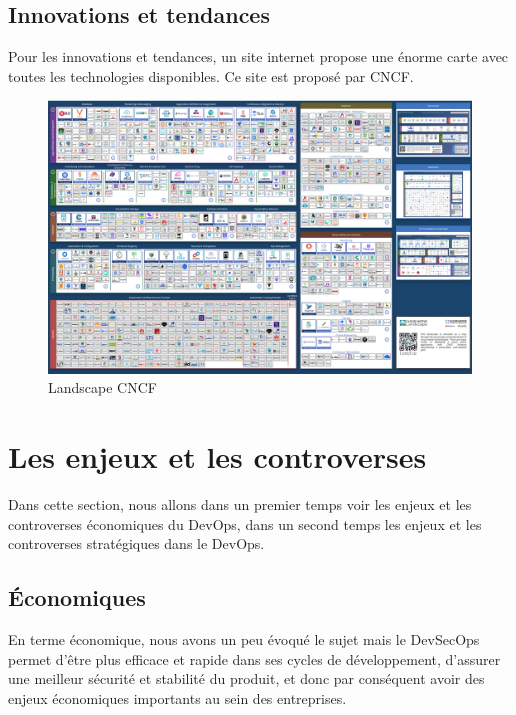 \documentclass[11pt,a4paper,oneside]{book}
\begin{document}
\subsection{Innovations et tendances}

Pour les innovations et tendances, un site internet propose une énorme carte avec toutes les technologies disponibles. Ce site est proposé par CNCF. \\

\begin{figure}[h]
\centering
\includegraphics[scale=0.35]{landscape-cncf}
\caption{Landscape CNCF}
\end{figure}

\newpage

\section{Les enjeux et les controverses}

Dans cette section, nous allons dans un premier temps voir les enjeux et les controverses économiques du DevOps, dans un second temps les enjeux et les controverses stratégiques dans le DevOps.

\subsection{Économiques}

En terme économique, nous avons un peu évoqué le sujet mais le DevSecOps permet d'être plus efficace et rapide dans ses cycles de développement, d'assurer une meilleur sécurité et stabilité du produit, et donc par conséquent avoir des enjeux économiques importants au sein des entreprises.
\end{document}
